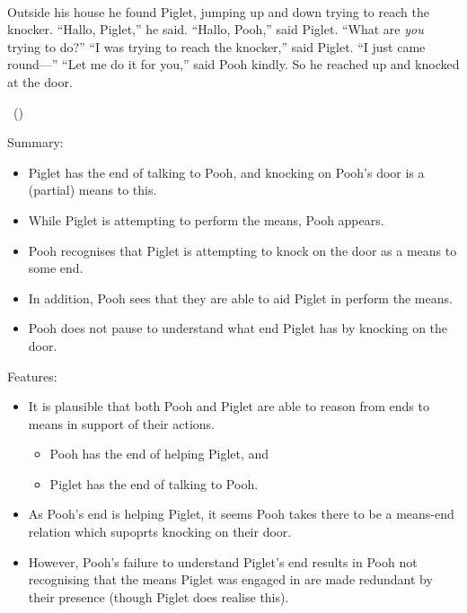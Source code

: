 \documentclass[10pt]{article}
\newcommand{\hozlinedash}[0]{%
  \noindent\hdashrule[0.5ex][c]{\textwidth}{.1pt}{2.5pt}
}
\begin{document}
\begin{scenario}\mbox{ }

  \noindent Outside his house he found Piglet, jumping up and down trying to reach the knocker.\newline
  ``Hallo, Piglet,'' he said.\newline
  ``Hallo, Pooh,'' said Piglet.\newline
  ``What are \emph{you} trying to do?''\newline
  ``I was trying to reach the knocker,'' said Piglet.
  ``I just came round---''\newline
  ``Let me do it for you,'' said Pooh kindly.
  So he reached up and knocked at the door.

  \mbox{ }\hfill\mbox{(\cite[77--78]{Milne:2009aa})}
\end{scenario}

\begin{center}
\end{center}

\hozlinedash

Summary:
\begin{itemize}[noitemsep]
\item Piglet has the end of talking to Pooh, and knocking on Pooh's door is a (partial) means to this.
\item While Piglet is attempting to perform the means, Pooh appears.
\item Pooh recognises that Piglet is attempting to knock on the door as a means to some end.
\item In addition, Pooh sees that they are able to aid Piglet in perform the means.
\item Pooh does not pause to understand what end Piglet has by knocking on the door.
\end{itemize}

Features:
\begin{itemize}[noitemsep]
\item It is plausible that both Pooh and Piglet are able to reason from ends to means in support of their actions.
  \begin{itemize}[noitemsep]
  \item Pooh has the end of helping Piglet, and
  \item Piglet has the end of talking to Pooh.
  \end{itemize}
\item As Pooh's end is helping Piglet, it seems Pooh takes there to be a means-end relation which supoprts knocking on their door.
\item However, Pooh's failure to understand Piglet's end results in Pooh not recognising that the means Piglet was engaged in are made redundant by their presence (though Piglet does realise this).
\end{itemize}
\end{document}
